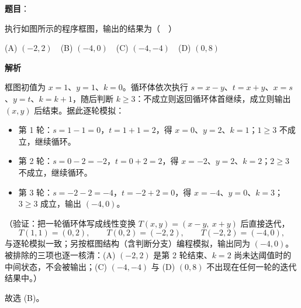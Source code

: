 \begin{answer}

\textbf{题目}：

执行如图所示的程序框图，输出的结果为（　）
\nopagebreak[4]
\begin{center}\end{center}
\nopagebreak[4]
(A) \((-2,2)\)　(B) \((-4,0)\)　(C) \((-4,-4)\)　(D) \((0,8)\)

\textbf{解析}

框图初值为 \(x=1\)、\(y=1\)、\(k=0\)。循环体依次执行 \(s=x-y\)、\(t=x+y\)、\(x=s\)、\(y=t\)、\(k=k+1\)，随后判断 \(k\geqslant3\)：不成立则返回循环体首继续，成立则输出 \((x,y)\) 后结束。据此逐轮模拟：

\begin{itemize}
\item 第 1 轮：\(s=1-1=0\)，\(t=1+1=2\)，得 \(x=0\)、\(y=2\)、\(k=1\)；\(1\geqslant3\) 不成立，继续循环。
\item 第 2 轮：\(s=0-2=-2\)，\(t=0+2=2\)，得 \(x=-2\)、\(y=2\)、\(k=2\)；\(2\geqslant3\) 不成立，继续循环。
\item 第 3 轮：\(s=-2-2=-4\)，\(t=-2+2=0\)，得 \(x=-4\)、\(y=0\)、\(k=3\)；\(3\geqslant3\) 成立，输出 \((-4,0)\)。
\end{itemize}
（验证：把一轮循环体写成线性变换 \(T(x,y)=(x-y,\ x+y)\) 后直接迭代，
\nopagebreak[4]
\[
T(1,1)=(0,2),\qquad T(0,2)=(-2,2),\qquad T(-2,2)=(-4,0),
\]
与逐轮模拟一致；另按框图结构（含判断分支）编程模拟，输出同为 \((-4,0)\)。被排除的三项也逐一核清：(A) \((-2,2)\) 是第 2 轮结束、\(k=2\) 尚未达阈值时的中间状态，不会被输出；(C) \((-4,-4)\) 与 (D) \((0,8)\) 不出现在任何一轮的迭代结果中。）

故选 (B)。


\end{answer}
